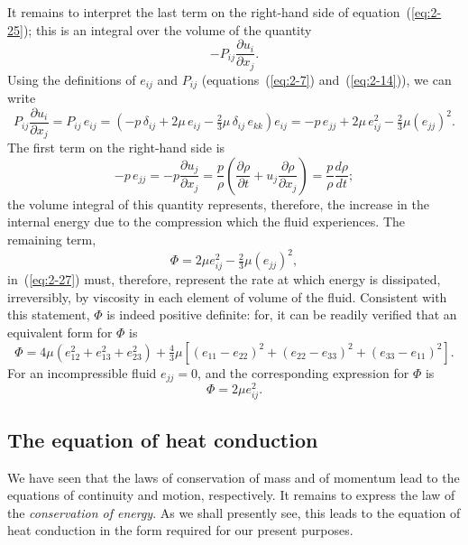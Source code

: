 It remains to interpret the last term on the right-hand side of equation~(\ref{eq:2-25}); this is an integral over the volume of the quantity
\begin{equation}
\label{eq:2-26}
-P_{ij}\frac{\partial u_i}{\partial x_j}.
\end{equation}
Using the definitions of $e_{ij}$ and $P_{ij}$ (equations~(\ref{eq:2-7}) and~(\ref{eq:2-14})), we can write
\begin{equation}
\label{eq:2-27}
P_{ij}\frac{\partial u_i}{\partial x_j} = P_{ij}\,e_{ij} = (-p\,\delta_{ij} + 2\mu\,e_{ij} - \tfrac{2}{3}\mu\,\delta_{ij}\,e_{kk})e_{ij} = -p\,e_{jj} + 2\mu\,e_{ij}^2 - \tfrac{2}{3}\mu(e_{jj})^2.
\end{equation}
The first term on the right-hand side is
\begin{equation}
\label{eq:2-28}
-p\,e_{jj} = -p\frac{\partial u_j}{\partial x_j} = \frac{p}{\rho}\!\left(\frac{\partial\rho}{\partial t} + u_j\frac{\partial\rho}{\partial x_j}\right) = \frac{p}{\rho}\frac{d\rho}{dt};
\end{equation}
the volume integral of this quantity represents, therefore, the increase
in the internal energy due to the compression which the fluid experiences.
The remaining term,
\begin{equation}
\label{eq:2-29}
\Phi = 2\mu e_{ij}^2 - \tfrac{2}{3}\mu(e_{jj})^2,
\end{equation}
in~(\ref{eq:2-27}) must, therefore, represent the rate at which energy is dissipated,
irreversibly, by viscosity in each element of volume of the fluid. Consistent with this statement, $\Phi$ is indeed positive definite: for, it can be
readily verified that an equivalent form for $\Phi$ is
\begin{equation}
\label{eq:2-30}
\Phi = 4\mu(e_{12}^2 + e_{13}^2 + e_{23}^2) + \tfrac{4}{3}\mu[(e_{11}-e_{22})^2 + (e_{22}-e_{33})^2 + (e_{33}-e_{11})^2].
\end{equation}
For an incompressible fluid $e_{jj} = 0$, and the corresponding expression
for $\Phi$ is
\begin{equation}
\label{eq:2-31}
\Phi = 2\mu e_{ij}^2.
\end{equation}

\subsection{The equation of heat conduction}\label{sec:7d}

We have seen that the laws of conservation of mass and of momentum
lead to the equations of continuity and motion, respectively. It remains
to express the law of the \emph{conservation of energy}. As we shall presently see,
this leads to the equation of heat conduction in the form required for
our present purposes.

